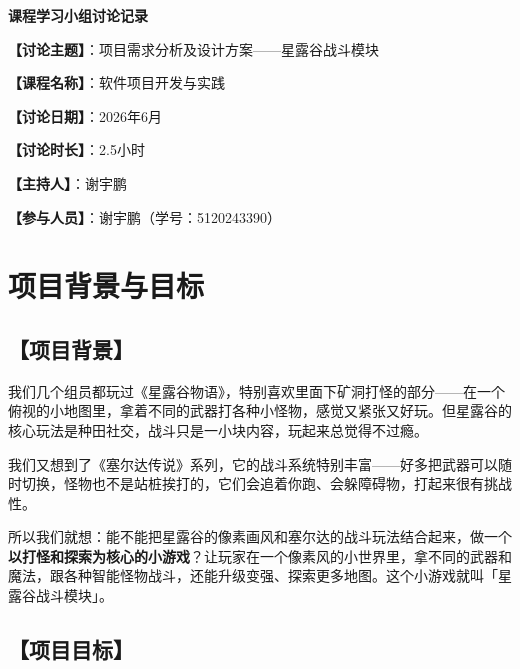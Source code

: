 \documentclass[12pt,a4paper]{article}
\begin{document}
\begin{center}
{\LARGE\bfseries 课程学习小组讨论记录}
\end{center}

\vspace{0.5cm}

\noindent\textbf{【讨论主题】}：项目需求分析及设计方案——星露谷战斗模块

\vspace{0.3cm}
\noindent\textbf{【课程名称】}：软件项目开发与实践

\vspace{0.3cm}
\noindent\textbf{【讨论日期】}：2026年6月

\vspace{0.3cm}
\noindent\textbf{【讨论时长】}：2.5小时

\vspace{0.3cm}
\noindent\textbf{【主持人】}：谢宇鹏

\vspace{0.3cm}
\noindent\textbf{【参与人员】}：谢宇鹏（学号：5120243390）

\vspace{0.8cm}

\section{项目背景与目标}

\subsection{【项目背景】}

我们几个组员都玩过《星露谷物语》，特别喜欢里面下矿洞打怪的部分——在一个俯视的小地图里，拿着不同的武器打各种小怪物，感觉又紧张又好玩。但星露谷的核心玩法是种田社交，战斗只是一小块内容，玩起来总觉得不过瘾。

我们又想到了《塞尔达传说》系列，它的战斗系统特别丰富——好多把武器可以随时切换，怪物也不是站桩挨打的，它们会追着你跑、会躲障碍物，打起来很有挑战性。

所以我们就想：能不能把星露谷的像素画风和塞尔达的战斗玩法结合起来，做一个\textbf{以打怪和探索为核心的小游戏}？让玩家在一个像素风的小世界里，拿不同的武器和魔法，跟各种智能怪物战斗，还能升级变强、探索更多地图。这个小游戏就叫「星露谷战斗模块」。

\subsection{【项目目标】}
\end{document}
